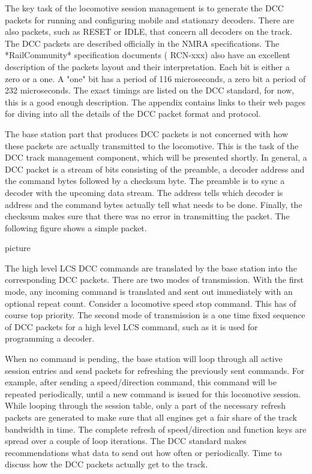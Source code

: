 The key task of the locomotive session management is to generate the DCC packets for running and configuring mobile and stationary decoders. There are also packets, such as RESET or IDLE, that concern all decoders on the track. The DCC packets are described officially in the NMRA specifications. The *RailCommunity* specification documents ( RCN-xxx) also have an excellent description of the packets layout and their interpretation. Each bit is either a zero or a one. A "one" bit has a period of 116 microseconds, a zero bit a period of 232 microseconds. The exact timings are listed on the DCC standard, for now, this is a good enough description. The appendix contains links to their web pages for diving into all the details of the DCC packet format and protocol.

The base station part that produces DCC packets is not concerned with how these packets are actually transmitted to the locomotive. This is the task of the DCC track management component, which will be presented shortly. In general, a DCC packet is a stream of bits consisting of the preamble, a decoder address and the command bytes followed by a checksum byte. The preamble is to sync a decoder with the upcoming data stream. The address tells which decoder is address and the command bytes actually tell what needs to be done. Finally, the checksum makes sure that there was no error in transmitting the packet. The following figure shows a simple packet.

picture 

\begin{figure}[h]
    \centering
\end{figure}

The high level LCS DCC commands are translated by the base station into the corresponding DCC packets. There are two modes of transmission. With the first mode, any incoming command is translated and sent out immediately with an optional repeat count. Consider a locomotive speed stop command. This has of course top priority. The second mode of transmission is a one time fixed sequence of DCC packets for a high level LCS command, such as it is used for programming a decoder.

When no command is pending, the base station will loop through all active session entries and send packets for refreshing the previously sent commands. For example, after sending a speed/direction command, this command will be repeated periodically, until a new command is issued for this locomotive session. While looping through the session table, only a part of the necessary refresh packets are generated to make sure that all engines get a fair share of the track bandwidth in time. The complete refresh of speed/direction and function keys are spread over a couple of loop iterations. The DCC standard makes recommendations what data to send out how often or periodically. Time to discuss how the DCC packets actually get to the track.

